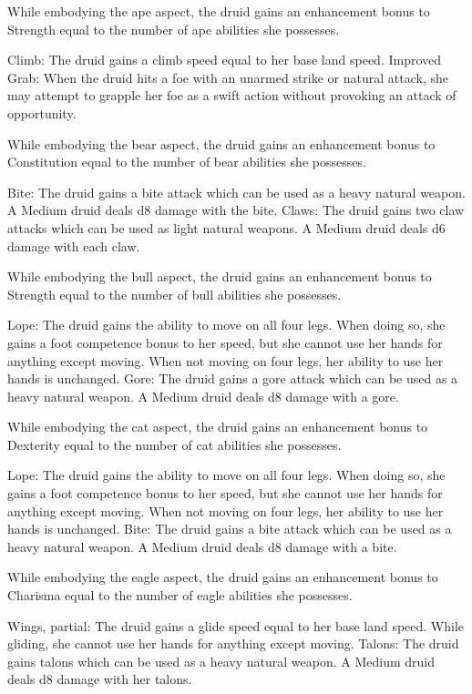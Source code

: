 While embodying the ape aspect, the druid gains an enhancement bonus to Strength equal to the number of ape abilities she possesses.
\begin{wildaspect}
\wilditem Climb: The druid gains a climb speed equal to her base land speed.
\wilditem Improved Grab: When the druid hits a foe with an unarmed strike or natural attack, she may attempt to grapple her foe as a swift action without provoking an attack of opportunity.
\end{wildaspect}

While embodying the bear aspect, the druid gains an enhancement bonus to Constitution equal to the number of bear abilities she possesses.
\begin{wildaspect}
\wilditem Bite: The druid gains a bite attack which can be used as a heavy natural weapon. A Medium druid deals d8 damage with the bite.
\wilditem Claws: The druid gains two claw attacks which can be used as light natural weapons. A Medium druid deals d6 damage with each claw.
\end{wildaspect}

While embodying the bull aspect, the druid gains an enhancement bonus to Strength equal to the number of bull abilities she possesses.
\begin{wildaspect}
\wilditem Lope: The druid gains the ability to move on all four legs. When doing so, she gains a  foot competence bonus to her speed, but she cannot use her hands for anything except moving. When not moving on four legs, her ability to use her hands is unchanged.
\wilditem Gore: The druid gains a gore attack which can be used as a heavy natural weapon. A Medium druid deals d8 damage with a gore.
\end{wildaspect}

While embodying the cat aspect, the druid gains an enhancement bonus to Dexterity equal to the number of cat abilities she possesses.
\begin{wildaspect}
\wilditem Lope: The druid gains the ability to move on all four legs. When doing so, she gains a  foot competence bonus to her speed, but she cannot use her hands for anything except moving. When not moving on four legs, her ability to use her hands is unchanged.
\wilditem Bite: The druid gains a bite attack which can be used as a heavy natural weapon. A Medium druid deals d8 damage with a bite.
\end{wildaspect}

While embodying the eagle aspect, the druid gains an enhancement bonus to Charisma equal to the number of eagle abilities she possesses.
\begin{wildaspect}
\wilditem Wings, partial: The druid gains a glide speed equal to her base land speed. While gliding, she cannot use her hands for anything except moving.
\wilditem Talons: The druid gains talons which can be used as a heavy natural weapon. A Medium druid deals d8 damage with her talons.
\end{wildaspect}


